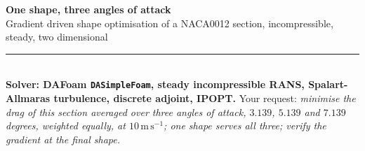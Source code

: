 \documentclass[9pt,a4paper]{article}
\renewcommand{\footnotesize}{\fontsize{6.4}{6.85}\selectfont}
\begin{document}
\fontsize{7.3}{8.0}\selectfont

{\fontsize{13.5}{15}\selectfont\bfseries One shape, three angles of attack}\\[1.5pt]
{\fontsize{8.6}{10}\selectfont Gradient driven shape optimisation of a
NACA0012 section, incompressible, steady, two dimensional}\\[2pt]
{\color{rulegrey}\rule{\textwidth}{0.9pt}}\\[1pt]
{\footnotesize \textbf{Solver: DAFoam \texttt{DASimpleFoam}, steady
incompressible RANS, Spalart-Allmaras turbulence, discrete adjoint, IPOPT.}
Your request: \emph{minimise the drag of this section averaged over three
angles of attack, $3.139$, $5.139$ and $7.139$ degrees, weighted equally, at
$10\,\mathrm{m\,s^{-1}}$; one shape serves all three; verify the gradient at
the final shape.}}
\end{document}
